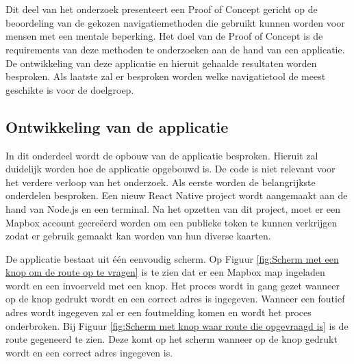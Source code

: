 
\chapter{}%
\label{ch:proof-of-concept}

Dit deel van het onderzoek presenteert een Proof of Concept gericht op de beoordeling van de gekozen navigatiemethoden die gebruikt kunnen worden voor mensen met een mentale beperking. Het doel van de Proof of Concept is de requirements van deze methoden te onderzoeken aan de hand van een applicatie. De ontwikkeling van deze applicatie en hieruit gehaalde resultaten worden besproken. Als laatste zal er besproken worden welke navigatietool de meest geschikte is voor de doelgroep.

\section{Ontwikkeling van de applicatie}
\label{sec:ontwikkeling van de applicatie}
In dit onderdeel wordt de opbouw van de applicatie besproken. Hieruit zal duidelijk worden hoe de applicatie opgebouwd is. De code is niet relevant voor het verdere verloop van het onderzoek. Als eerste worden de belangrijkste onderdelen besproken. Een nieuw React Native project wordt aangemaakt aan de hand van Node.js en een terminal. Na het opzetten van dit project, moet er een Mapbox account gecreëerd worden om een publieke token te kunnen verkrijgen zodat er gebruik gemaakt kan worden van hun diverse kaarten.

De applicatie bestaat uit één eenvoudig scherm. Op Figuur \ref{fig:Scherm met een knop om de route op te vragen} is te zien dat er een Mapbox map ingeladen wordt en een invoerveld met een knop. Het proces wordt in gang gezet wanneer op de knop gedrukt wordt en een correct adres is ingegeven. Wanneer een foutief adres wordt ingegeven zal er een foutmelding komen en wordt het proces onderbroken. Bij Figuur \ref{fig:Scherm met knop waar route die opgevraagd is} is de route gegeneerd te zien. Deze komt op het scherm wanneer op de knop gedrukt wordt en een correct adres ingegeven is.

